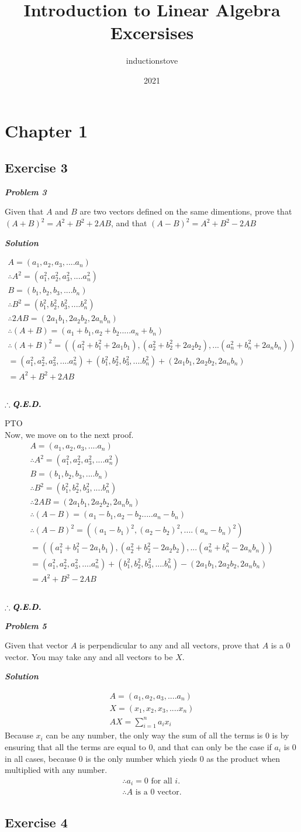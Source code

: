 \documentclass{article}
\title{Introduction to Linear Algebra Excersises}
\author{inductionstove}
\date{2021}
\newcommand{\qst}[1]{\begin{center}\textit{\textbf{Problem #1}}\end{center}}
\newcommand{\sol}{\begin{center}\textit{\textbf{Solution}}\end{center}}
\newcommand{\thf}{\\\therefore}
\newcommand{\qed}{\\\begin{center}$\therefore \textbf{\textit{Q.E.D.}}$\end{center}}
\newcommand{\subsec}[1]{\newpage \subsection*{#1}}
\begin{document}
\maketitle
\section*{Chapter 1}
\subsection*{Exercise 3}
\begin{center}\textit{\textbf{Problem 3}}\end{center}
Given that $A$ and $B$ are two vectors defined on the same dimentions, prove that $(A+B)^2=A^2+B^2+2AB$, and that $(A-B)^2=A^2+B^2-2AB$
\sol
\begin{gather*}
A=(a_1, a_2, a_3,....a_n)
\thf A^2 = (a_1^2, a_2^2, a_3^2,....a_n^2)
\\B=(b_1, b_2, b_3,....b_n)
\thf B^2=(b_1^2, b_2^2, b_3^2,....b_n^2)
\thf 2AB = (2a_1b_1, 2a_2b_2, 2a_nb_n)
\thf (A+B)=(a_1+b_1, a_2+b_2.....a_n+b_n)
\thf (A+B)^2=((a_1^2+b_1^2+2a_1b_1),(a_2^2+b_2^2+2a_2b_2),...(a_n^2+b_n^2+2a_nb_n))
\\=(a_1^2, a_2^2, a_3^2,....a_n^2)+(b_1^2, b_2^2, b_3^2,....b_n^2)+(2a_1b_1, 2a_2b_2, 2a_nb_n)
\\=A^2+B^2+2AB
\end{gather*}
\qed
PTO
\\Now, we move on to the next proof.
\begin{gather*}
A=(a_1, a_2, a_3,....a_n)
\thf A^2 = (a_1^2, a_2^2, a_3^2,....a_n^2)
\\B=(b_1, b_2, b_3,....b_n)
\thf B^2=(b_1^2, b_2^2, b_3^2,....b_n^2)
\thf 2AB = (2a_1b_1, 2a_2b_2, 2a_nb_n)
\thf (A-B)=(a_1-b_1, a_2-b_2.....a_n-b_n)
\thf (A-B)^2=((a_1-b_1)^2, (a_2-b_2)^2,....(a_n-b_n)^2)
\\=((a_1^2+b_1^2-2a_1b_1),(a_2^2+b_2^2-2a_2b_2),...(a_n^2+b_n^2-2a_nb_n))
\\=(a_1^2, a_2^2, a_3^2,....a_n^2)+(b_1^2, b_2^2, b_3^2,....b_n^2)-(2a_1b_1, 2a_2b_2, 2a_nb_n)
\\=A^2+B^2-2AB
\end{gather*}
\qed
\qst{5}
Given that vector $A$ is perpendicular to any and all vectors, prove that $A$ is a 0 vector. You may take any and all vectors to be $X$.
\sol
\begin{gather*}
A=(a_1, a_2, a_3,....a_n)
\\X=(x_1, x_2, x_3,....x_n)
\\AX=\sum^{n}_{i=1}a_ix_i
\end{gather*}
Because $x_i$ can be any number, the only way the sum of all the terms is 0 is by ensuring that all the terms are equal to 0, and that can only be the case if $a_i$ is 0 in all cases, because 0 is the only number which yieds 0 as the product when multiplied with any number.
\begin{gather*}
\therefore a_i = 0 \text{ for all }i.
\thf A \text{ is a 0 vector.}
\end{gather*}
\subsec{Exercise 4}
\end{document}
